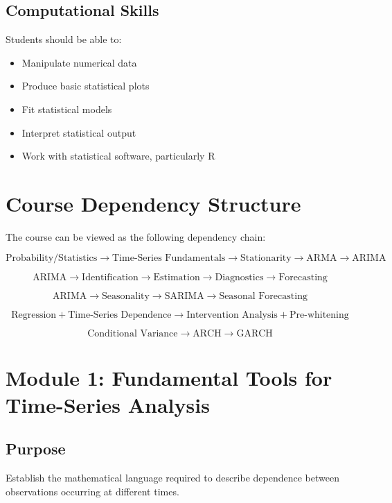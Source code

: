 \documentclass[11pt]{article}
\begin{document}
\subsection{Computational Skills}

Students should be able to:

\begin{itemize}
    \item Manipulate numerical data
    \item Produce basic statistical plots
    \item Fit statistical models
    \item Interpret statistical output
    \item Work with statistical software, particularly R
\end{itemize}

\section{Course Dependency Structure}

The course can be viewed as the following dependency chain:

\[
\boxed{
\text{Probability/Statistics}
\rightarrow
\text{Time-Series Fundamentals}
\rightarrow
\text{Stationarity}
\rightarrow
\text{ARMA}
\rightarrow
\text{ARIMA}
}
\]

\[
\boxed{
\text{ARIMA}
\rightarrow
\text{Identification}
\rightarrow
\text{Estimation}
\rightarrow
\text{Diagnostics}
\rightarrow
\text{Forecasting}
}
\]

\[
\boxed{
\text{ARIMA}
\rightarrow
\text{Seasonality}
\rightarrow
\text{SARIMA}
\rightarrow
\text{Seasonal Forecasting}
}
\]

\[
\boxed{
\text{Regression}
+
\text{Time-Series Dependence}
\rightarrow
\text{Intervention Analysis}
+
\text{Pre-whitening}
}
\]

\[
\boxed{
\text{Conditional Variance}
\rightarrow
\text{ARCH}
\rightarrow
\text{GARCH}
}
\]

\section{Module 1: Fundamental Tools for Time-Series Analysis}

\subsection{Purpose}

Establish the mathematical language required to describe dependence
between observations occurring at different times.
\end{document}
